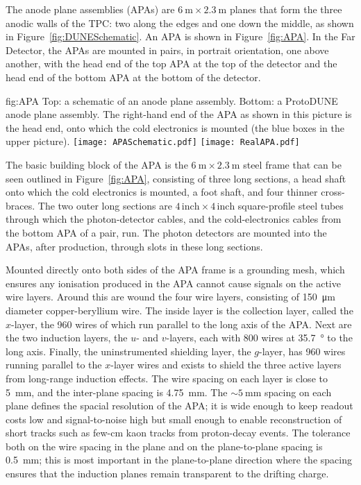 The anode plane assemblies (APAs) are $\SI{6}{\meter}\times\SI{2.3}{\meter}$ planes that form the three anodic walls of the TPC: two along the edges and one down the middle, as shown in Figure~\ref{fig:DUNESchematic}. An APA is shown in Figure~\ref{fig:APA}. In the Far Detector, the APAs are mounted in pairs, in portrait orientation, one above another, with the head end of the top APA at the top of the detector and the head end of the bottom APA at the bottom of the detector.

\begin{dunefigure}{fig:APA}
{Top: a schematic of an anode plane assembly. Bottom: a ProtoDUNE anode plane assembly. The right-hand end of the APA as shown in this picture is the head end, onto which the cold electronics is mounted (the blue boxes in the upper picture). }
\texttt{[image: APASchematic.pdf]}
\texttt{[image: RealAPA.pdf]}
\end{dunefigure}

The basic building block of the APA is the $\SI{6}{\meter}\times\SI{2.3}{\meter}$ steel frame that can be seen outlined in Figure~\ref{fig:APA}, consisting of three long sections, a head shaft onto which the cold electronics is mounted, a foot shaft, and four thinner cross-braces. The two outer long sections are $4\,\mathrm{inch}\times 4\,\mathrm{inch}$ square-profile steel tubes through which the photon-detector cables, and the cold-electronics cables from the bottom APA of a pair, run. The photon detectors are mounted into the APAs, after production, through slots in these long sections.

Mounted directly onto both sides of the APA frame is a grounding mesh, which ensures any ionisation produced in the APA cannot cause signals on the active wire layers. Around this are wound the four wire layers, consisting of \SI{150}{\micro\meter} diameter copper-beryllium wire. The inside layer is the collection layer, called the $x$-layer, the 960 wires of which run parallel to the long axis of the APA. Next are the two induction layers, the $u$- and $v$-layers, each with 800 wires at \SI{35.7}{\degree} to the long axis. Finally, the uninstrumented shielding layer, the $g$-layer, has 960 wires running parallel to the $x$-layer wires and exists to shield the three active layers from long-range induction effects. The wire spacing on each layer is close to \SI{5}{\mm}, and the inter-plane spacing is \SI{4.75}{\mm}. The $\sim\!\SI{5}{\mm}$ spacing on each plane defines the spacial resolution of the APA; it is wide enough to keep readout costs low and signal-to-noise high but small enough to enable reconstruction of short tracks such as few-\si{\cm} kaon tracks from proton-decay events. The tolerance both on the wire spacing in the plane and on the plane-to-plane spacing is \SI{0.5}{\mm}; this is most important in the plane-to-plane direction where the spacing ensures that the induction planes remain transparent to the drifting charge.

